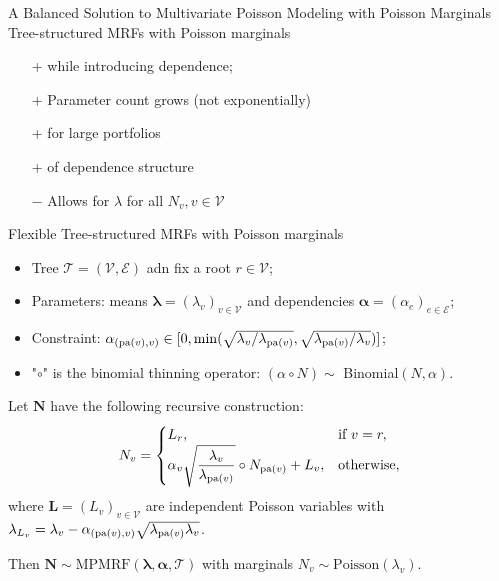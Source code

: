 \documentclass[11pt,xcolor={dvipsnames},hyperref={pdftex,pdfpagemode=UseNone,hidelinks,pdfdisplaydoctitle=true},usepdftitle=false]{beamer}
\begin{document}
\begin{frame}{A Balanced Solution to Multivariate Poisson Modeling with Poisson Marginals}
Tree-structured MRFs with Poisson marginals \citep{cote2025tree} 
\begin{itemize}
        \item[+]  while introducing dependence;
        \vfill
        \item[+] Parameter count grows  
        (not exponentially)
        \vfill
        \item[+]  for large portfolios
        \vfill
        \item[+]  of dependence structure
        \vfill
        \item[$-$] Allows for  $\lambda$ for all $N_v, v \in \mathcal{V}$ 
\end{itemize}
\end{frame}
\begin{frame}{Flexible Tree-structured MRFs with Poisson marginals}
    \begin{itemize}
            \item Tree $\mathcal{T} = (\mathcal{V}, \mathcal{E})$ adn fix a root $r \in \mathcal{V}$;
            \item Parameters: means $\boldsymbol{\lambda} = (\lambda_v)_{v \in \mathcal{V}}$ and dependencies $\boldsymbol{\alpha} = (\alpha_e)_{e \in \mathcal{E}}$;
            \item Constraint: $\alphav{v} \in [0, \min(\sqrt{{\lambda_{v}}/{\lambda_{\pa{v}}}}, \sqrt{{\lambda_{\pa{v}}}/{\lambda_{v}}})]$;
         \item  "$\circ$" is the binomial thinning operator: $(\alpha\circ N) \sim$ Binomial$(N,\alpha)$.
    \end{itemize}
    \pause
\begin{theorem}
Let $\boldsymbol{N}$ have the following recursive construction:
        \begin{equation*}
        N_v = 
        \begin{cases}
        L_r, & \text{if } v = r, \\ 
        \alpha_v \sqrt{\dfrac{\lambda_v}{\lambda_{\pa{v}}}} \circ N_{\pa{v}} + L_v, & \text{otherwise},
        \end{cases}
        \vspace{-0.1cm}
        \end{equation*}
        where $\boldsymbol{L} = (L_v)_{v\in\mathcal{V}}$ are independent Poisson variables with $\lambda_{L_v} = \lambda_v- \alpha_{(\mathrm{pa}(v), v)}\sqrt{\lambda_{\mathrm{pa}(v)}\lambda_v}$.
        
        Then $\boldsymbol{N} \sim \text{MPMRF}(\boldsymbol{\lambda}, \boldsymbol{\alpha}, \mathcal{T})$ with marginals $N_v \sim \text{Poisson}(\lambda_v)$.
\end{theorem}
    

\end{frame}
\end{document}
